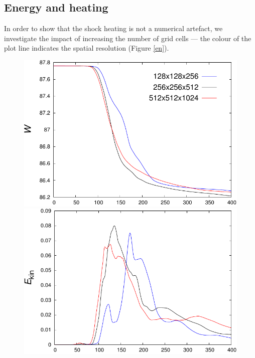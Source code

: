\documentclass{./packages/rs/rsproca}
\begin{document}
\subsection{Energy and heating}
\label{sec_NumericalResults_EnergyHeating}

In order to show that the shock heating is not a numerical artefact, we investigate the impact of increasing the number of grid cells --- the colour of the plot line indicates the spatial resolution (Figure \ref{en}).
\begin{figure}[h!]
  \center  
  \includegraphics[scale=0.52]{./gnuplot/en_w}
  \includegraphics[scale=0.52]{./gnuplot/en_kin}\\
  \vspace{10pt}

\end{figure}
\end{document}
